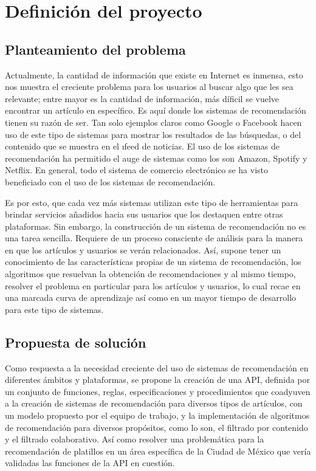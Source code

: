 \chapter {Definición del proyecto}
	\section{Planteamiento del problema}
		Actualmente, la cantidad de información que existe en Internet es inmensa, esto nos muestra el creciente problema para los usuarios al buscar algo que les sea relevante; entre mayor es la cantidad de información, más díficil se vuelve encontrar un artículo en específico. Es aquí donde los sistemas de recomendación tienen su razón de ser. Tan solo ejemplos claros como Google o Facebook hacen uso de este tipo de sistemas para mostrar los resultados de las búsquedas, o del contenido que se muestra en el \i{feed} de noticias. El uso de los sistemas de recomendación ha permitido el auge de sistemas como los son Amazon, Spotify y Netflix. En general, todo el sistema de comercio electrónico se ha visto beneficiado con el uso de los sistemas de recomendación. 

		Es por esto, que cada vez más sistemas utilizan este tipo de herramientas para brindar servicios añadidos hacia sus usuarios que los destaquen entre otras plataformas. Sin embargo, la construcción de un sistema de recomendación no es una tarea sencilla. Requiere de un proceso consciente de análisis para la manera en que los artículos y usuarios se verán relacionados. Así, supone tener un conocimiento de las características propias de un sistema de recomendación, los algoritmos que resuelvan la obtención de recomendaciones y al mismo tiempo, resolver el problema en particular para los artículos y usuarios, lo cual recae en una marcada curva de aprendizaje así como en un mayor tiempo de desarrollo para este tipo de sistemas.

	\section{Propuesta de solución}
		Como respuesta a la necesidad creciente del uso de sistemas de recomendación en diferentes ámbitos y plataformas, se propone la creación de una API, definida por un conjunto de funciones, reglas, especificaciones y procedimientos que coadyuven a la creación de sistemas de recomendación para diversos tipos de artículos, con un modelo propuesto por el equipo de trabajo, y la implementación de algoritmos de recomendación para diversos propósitos, como lo son, el filtrado por contenido y el filtrado colaborativo. Así como resolver una problemática para la recomendación de platillos en un área específica de la Ciudad de México que vería validadas las funciones de la API en cuestión. 

